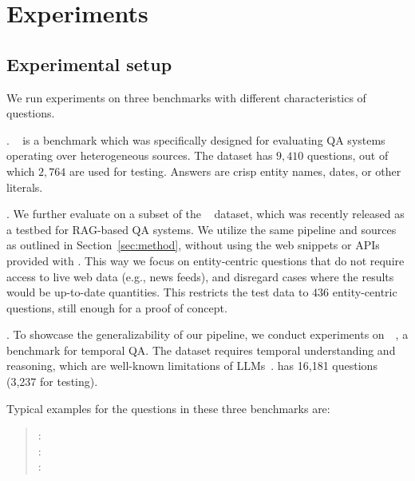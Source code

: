 \label{sec:exp}
\section{Experiments}


\label{setup}
\subsection{Experimental setup}


 We run experiments on three benchmarks with different characteristics of questions.

\squishlist
    \item \textbf{\compmix}.
    \compmix~\cite{Christmann-CompMix:WWW2024} is a benchmark which was specifically designed for evaluating QA systems operating over heterogeneous sources. The dataset has $9{,}410$ questions, out of which $2{,}764$ are used for testing.
    Answers are crisp entity names, dates, or other literals.
    
    \item \textbf{\crag}.
    We further evaluate on a subset of the \crag~\cite{Yang-CRAG} dataset, which was recently released as a testbed for RAG-based QA systems.
    We utilize the same pipeline and sources as outlined in Section~\ref{sec:method}, without using the web snippets or APIs provided with \crag. This way we focus on entity-centric questions that do not require access to live web data (e.g., news feeds), and disregard cases where the results would be up-to-date quantities.
    This restricts the test data to $436$ entity-centric questions, still enough for a proof of concept.
    
    \item \textbf{\timequestions}.
    To showcase the generalizability of our pipeline, we conduct experiments on~\timequestions~\cite{Jia-TimeQuestions},
    a benchmark for temporal QA. The dataset requires temporal understanding and reasoning, which are well-known limitations of
    LLMs~\cite{Dhingra-time-aware-LLM:TACL2022}. \timequestions has 16{,}181 questions (3{,}237 for testing).
\squishend

Typical examples for the questions in these three benchmarks are:

\begin{quote}
\compmix: \\
 \indent \crag: \\ 
  \indent \timequestions: 
\end{quote}

